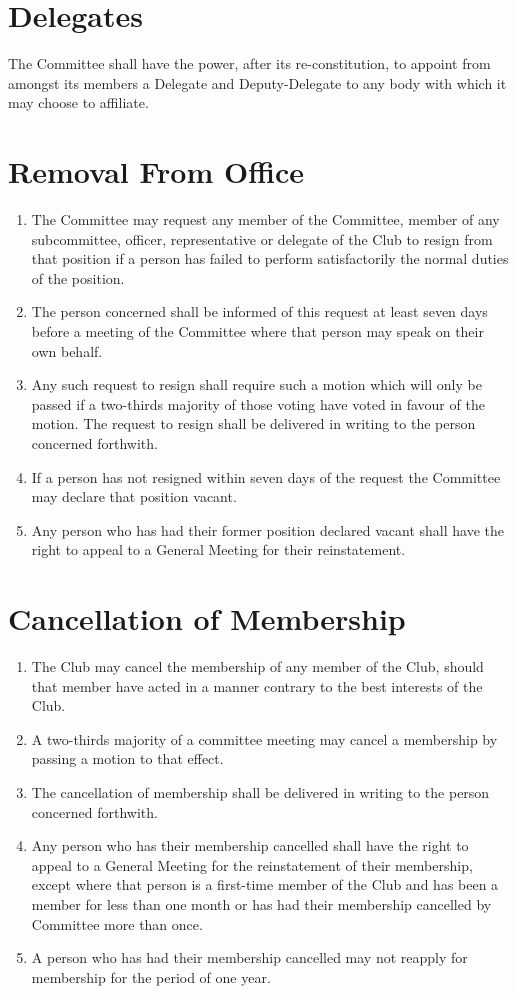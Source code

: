 \documentclass[11pt]{article} %
\begin{document}
\section{Delegates}
The Committee shall have the power, after its re-constitution, to appoint from amongst its members a Delegate and Deputy-Delegate to any body with which it may choose to affiliate.

\section{Removal From Office}
\begin{enumerate}
	\item The Committee may request any member of the Committee, member of any subcommittee, officer, representative or delegate of the Club to resign from that position if a person has failed to perform satisfactorily the normal duties of the position.
	\item The person concerned shall be informed of this request at least seven days before a meeting of the Committee where that person may speak on their own behalf.
	\item Any such request to resign shall require such a motion which will only be passed if a two-thirds majority of those voting have voted in favour of the motion. The request to resign shall be delivered in writing to the person concerned forthwith.
	\item If a person has not resigned within seven days of the request the Committee may declare that position vacant.
	\item Any person who has had their former position declared vacant shall have the right to appeal to a General Meeting for their reinstatement.
\end{enumerate}

\section{Cancellation of Membership}
\begin{enumerate}
\item The Club may cancel the membership of any member of the Club, should that member have acted in a manner contrary to the best interests of the Club.
\item A two-thirds majority of a committee meeting may cancel a membership by passing a motion to that effect.
\item The cancellation of membership shall be delivered in writing to the person concerned forthwith.
\item Any person who has their membership cancelled shall have the right to appeal to a General Meeting for the reinstatement of their membership, except where that person is a first-time member of the Club and has been a member for less than one month or has had their membership cancelled by Committee more than once.
\item A person who has had their membership cancelled may not reapply for membership for the period of one year.
\end{enumerate}
\end{document}
